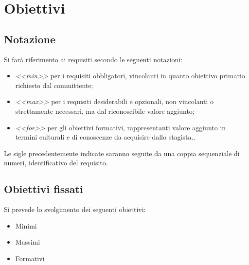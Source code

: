 \section*{Obiettivi}
\subsection*{Notazione}
Si farà riferimento ai requisiti secondo le seguenti notazioni:
\begin{itemize}
	\item \textit{<<min>>} per i requisiti obbligatori, vincolanti in quanto obiettivo primario richiesto dal committente;
	\item \textit{<<max>>} per i requisiti desiderabili e opzionali, non vincolanti o strettamente necessari,
		  ma dal riconoscibile valore aggiunto;
	\item \textit{<<for>>} per gli obiettivi formativi, rappresentanti valore aggiunto in termini culturali e di conoscenze da acquisire dallo stagista..
\end{itemize}

Le sigle precedentemente indicate saranno seguite da una coppia sequenziale di numeri, identificativo del requisito.

\subsection*{Obiettivi fissati}
Si prevede lo svolgimento dei seguenti obiettivi:
\begin{itemize}
	\item Minimi
	\begin{itemize}
		\obiettiviObbligatori
	\end{itemize}
	
	\item Massimi 
	\begin{itemize}
		\obiettiviDesiderabili
	\end{itemize}
	
	\item Formativi
	\begin{itemize}
		\obiettiviFacoltativi
	\end{itemize} 
\end{itemize}

\newpage